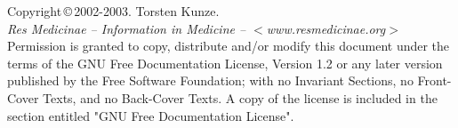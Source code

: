 \vspace*{16.7cm}

    Copyright\,\copyright\,2002-2003. Torsten Kunze.\\
    {\it Res Medicinae -- Information in Medicine -- \(<\)www.resmedicinae.org\(>\)}\\
    Permission is granted to copy, distribute and/or modify this document
    under the terms of the GNU Free Documentation License, Version 1.2
    or any later version published by the Free Software Foundation;
    with no Invariant Sections, no Front-Cover Texts, and no Back-Cover Texts.
    A copy of the license is included in the section entitled "GNU
    Free Documentation License".
